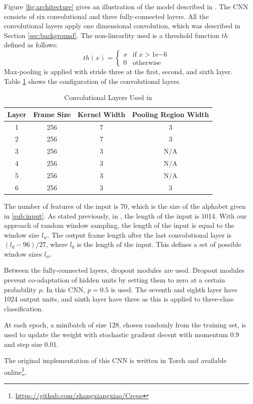 Figure \ref{fig:architecture} gives an illustration of the model described in \citep{zhang2015character}.
The CNN consists of six convolutional and three fully-connected layers.
All the convolutional layers apply one dimensional convolution, which was described in Section \ref{sec:background}.
The non-linearlity used is a threshold function $th$ defined as follows:
\[
  th(x) =
  \begin{cases}
    x & \text{if $x > 1\mathrm{e}{-6}$} \\
    0 & \text{otherwise}
  \end{cases}
\]
Max-pooling is applied with stride three at the first, second, and sixth layer.
Table \ref{tab:conv-config} shows the configuration of the convolutional layers.
\begin{table}[h]
\centering
\caption{Convolutional Layers Used in \citep{zhang2015character}}
\label{tab:conv-config}
\begin{tabular}{cccc}
Layer & Frame Size & Kernel Width & Pooling Region Width \\ \hline
1     & 256        & 7            & 3                    \\
2     & 256        & 7            & 3                    \\
3     & 256        & 3            & N/A                  \\
4     & 256        & 3            & N/A                  \\
5     & 256        & 3            & N/A                  \\
6     & 256        & 3            & 3                   
\end{tabular}
\end{table}
The number of features of the input is 70, which is the size of the alphabet given in \ref{sub:input}.
As stated previously, in \citep{zhang2015character}, the length of the input is 1014.
With our approach of random window sampling, the length of the input is equal to the window size $l_w$.
The output frame length after the last convolutional layer is $(l_0 - 96) / 27$, where $l_0$ is the length of the input.
This defines a set of possible window sizes $l_w$.

Between the fully-connected layers, dropout modules \citep{hinton2012improving} are used.
Dropout modules prevent co-adaptation of hidden units by setting them to zero at a certain probability $p$. 
In this CNN, $p = 0.5$ is used.
The seventh and eighth layer have 1024 output units, and ninth layer have three as this is applied to three-class classification.

At each epoch, a minibatch of size 128, chosen randomly from the training set, is used to update the weight with stochastic gradient decent \citep{polyak1964some} with momentum \citep{sutskever2013importance} 0.9 and step size 0.01.

The original implementation of this CNN is written in Torch \citep{torch} and available online\footnote{\url{https://github.com/zhangxiangxiao/Crepe}}.